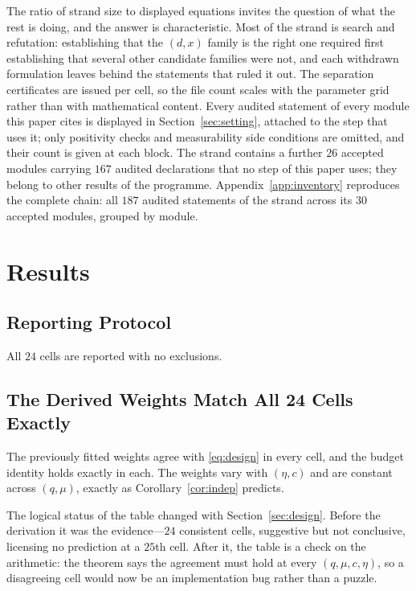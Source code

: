 \documentclass[conference]{IEEEtran}
\theoremstyle{definition}
\begin{document}
The ratio of strand size to displayed equations invites the question of what the rest is doing,
and the answer is characteristic. Most of the strand is search and refutation: establishing
that the $(d,x)$ family is the right one required first establishing that several other
candidate families were not, and each withdrawn formulation leaves behind the statements that
ruled it out. The separation certificates are issued per cell, so the file count scales with
the parameter grid rather than with mathematical content.
Every audited statement of every module this paper cites is displayed in Section~\ref{sec:setting}, attached to the step that uses it; only positivity checks and measurability side conditions are omitted, and their count is given at each block. The strand contains a further $26$ accepted modules carrying $167$ audited declarations that no step of this paper uses; they belong to other results of the programme. Appendix~\ref{app:inventory} reproduces the complete chain: all $187$ audited statements of the strand across its $30$ accepted modules, grouped by module.

\section{Results}
\label{sec:results}

\subsection{Reporting Protocol}

All $24$ cells are reported with no exclusions.

\subsection{The Derived Weights Match All 24 Cells Exactly}

The previously fitted weights agree with \eqref{eq:design} in every cell, and the budget
identity holds exactly in each. The weights vary with $(\eta,c)$ and are constant across
$(q,\mu)$, exactly as Corollary~\ref{cor:indep} predicts.

The logical status of the table changed with Section~\ref{sec:design}. Before the derivation
it was the evidence---$24$ consistent cells, suggestive but not conclusive, licensing no
prediction at a $25$th cell. After it, the table is a check on the arithmetic: the theorem
says the agreement must hold at every $(q,\mu,c,\eta)$, so a disagreeing cell would now be an
implementation bug rather than a puzzle.
\end{document}
